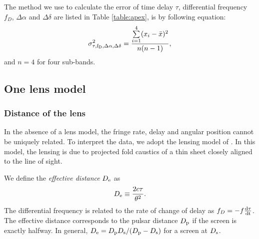 \documentclass[useAMS,usenatbib]{mn2e}
\begin{document}
The method we use to calculate the error of time delay $\tau$, differential frequency $f_D$, $\Delta\alpha$ and $\Delta\delta$ are listed in Table \ref{table:apex}, is by following equation:
\begin{equation}
\begin{aligned}
\sigma^2_{\rm \tau, f_D,\Delta\alpha, \Delta\delta} = \frac{\sum\limits^{4}_{i=1}(x_i-\bar{x})^2}{n(n-1)},
\end{aligned}
\end{equation}
and $n=4$ for four sub-bands.


\subsection{One lens model}
\subsubsection{Distance of the lens}
In the absence of a lens model, the
fringe rate, delay and angular position cannot be uniquely related. To interpret the data, we adopt the lensing model of
\citep{2014MNRAS.442.3338P}.  In this model, the lensing is due to projected fold caustics of a thin sheet closely aligned to the line of sight. 




We define the {\it effective distance} $D_{\rm e}$ as
\begin{equation}
D_{\rm e} \equiv \frac{2c\tau}{\theta^2}.
\end{equation}
The differential frequency is related to the rate of change of delay
as $f_D  =-f\frac{\rm d\tau}{\rm dt}$.  The effective distance
corresponds to the pulsar distance $D_{\rm p}$ if the screen is exactly halfway.
In general, $D_{\rm e}={D_{\rm p} D_{\rm s}}/({D_{\rm p} - D_{\rm
    s}})$ for a screen at $D_{\rm s}$.
\end{document}
